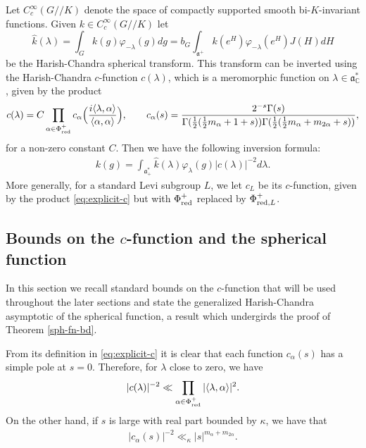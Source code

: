 \documentclass[12pt]{amsart}
\theoremstyle{remark}
\newcommand{\C}{\mathbb C}
\newcommand{\ga}{\mathfrak a}
\begin{document}
Let $C_c^\infty(G/\!\!/K)$ denote the space of compactly supported smooth bi-$K$-invariant functions. Given $k \in C_c^\infty(G /\!\!/ K)$ let
\begin{equation}\label{eq:HC-transform}
\widehat{k}(\lambda) = \int_G k(g) \varphi_{-\lambda}(g) dg= b_G \int_{\ga^+} k(e^H) \varphi_{-\lambda}(e^H) J(H)dH
\end{equation}
be the Harish-Chandra spherical transform. This transform can be inverted using the Harish-Chandra $c$-function $c(\lambda)$, which is a meromorphic function on $\lambda\in\ga^*_\C$, given by the product
\begin{equation}\label{eq:explicit-c}
c(\lambda)=C\prod_{\alpha\in\Phi_{\textnormal{red}}^+}c_\alpha\Big( \frac{i \langle \lambda, \alpha \rangle}{\langle \alpha, \alpha \rangle}\Big),\qquad c_\alpha(s) = \frac{2^{-s} \Gamma (s)}{\Gamma(\frac{1}{2}(\frac{1}{2}m_\alpha + 1 + s)) \Gamma(\frac{1}{2}(\frac{1}{2}m_\alpha + m_{2 \alpha} + s))},
\end{equation}
for a non-zero constant $C$. Then we have the following inversion formula:
\begin{gather*}
    k(g) = \int_{\ga_+^*} \widehat{k}(\lambda) \varphi_{\lambda}(g) |c(\lambda)|^{-2} d \lambda.
\end{gather*}
More generally, for a standard Levi subgroup $L$, we let $c_L$ be its $c$-function, given by the product \eqref{eq:explicit-c} but with $\Phi_{\textnormal{red}}^+$ replaced by $\Phi^+_{\textnormal{red},L}$. 


\subsection{Bounds on the $c$-function and the spherical function}\label{sec:c-bds}
In this section we recall standard bounds on the $c$-function that will be used throughout the later sections and state the generalized Harish-Chandra asymptotic of the spherical function, a result which undergirds the proof of Theorem \ref{sph-fn-bd}.

From its definition in \eqref{eq:explicit-c} it is clear that each function $c_\alpha(s)$ has a simple pole at $s = 0$. Therefore, for $\lambda$ close to zero, we have
\begin{gather} \label{eqn_c_lambda_small}
    |c(\lambda)|^{-2} \ll \prod_{\alpha \in \Phi_{\textnormal{red}}^+} |\langle \lambda, \alpha \rangle|^2.
\end{gather}
On the other hand, if $s$ is large with real part bounded by $\kappa$, we have that \cite{Duistermaat_Kolk_Varadarajan_79}
\begin{gather} \label{eqn_c_lambda_big}
    |c_{\alpha}(s)|^{-2} \ll_\kappa |s|^{m_\alpha + m_{2 \alpha}}. 
\end{gather}
\end{document}
